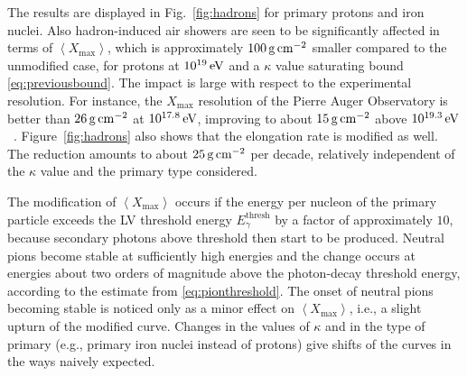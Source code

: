 \documentclass[aps,prd,preprint,longbibliography]{revtex4-1}
\begin{document}
The results are displayed in Fig.~\ref{fig:hadrons}
for primary protons and iron nuclei. Also hadron-induced air showers
are seen to be significantly affected in terms of $\left<X_\text{max}\right>$, which is approximately
$\unit[100]{g\,cm^{-2}}$ smaller compared to the unmodified case,
for protons at $\unit[10^{19}]{eV}$ and a $\kappa$
value saturating bound \eqref{eq:previousbound}.
The impact is large with respect to the experimental resolution.
For instance, the $X_\text{max}$ resolution of the Pierre Auger Observatory
is better than $\unit[26]{g\,cm^{-2}}$ at $\unit[10^{17.8}]{eV}$, improving
to about $\unit[15]{g\,cm^{-2}}$ above $\unit[10^{19.3}]{eV}$~\cite{Auger2014}.
Figure~\ref{fig:hadrons} also shows that the
elongation rate is modified as well. The reduction amounts to
about $\unit[25]{g\,cm^{-2}}$ per decade,
relatively independent of  the $\kappa$ value
and the primary type considered.

The modification of $\left<X_\text{max}\right>$ occurs
if the energy per nucleon of the primary particle exceeds
the LV threshold energy $E^\text{thresh}_\gamma$
by a factor of approximately $10$,
because secondary photons above threshold then start to be produced.
Neutral pions become stable at sufficiently high energies
and the change occurs at energies about two orders of magnitude
above the photon-decay threshold energy, according to the
estimate from \eqref{eq:pionthreshold}.
The onset of neutral pions becoming stable is noticed only as a minor
effect on $\left<X_\text{max}\right>$, i.e.,
a slight upturn of the modified curve.
Changes in the values of $\kappa$ and in the type of primary
(e.g., primary iron nuclei instead of protons)
give shifts of the curves in the ways naively expected.
\end{document}
